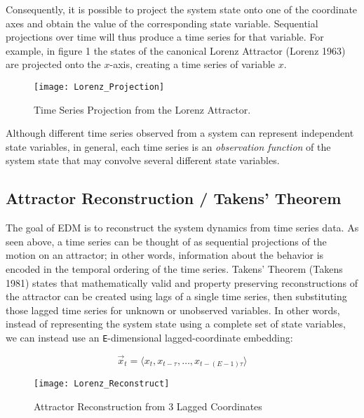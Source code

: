 \documentclass[]{article}
\begin{document}
Consequently, it is possible to project the system state onto one of the
coordinate axes and obtain the value of the corresponding state
variable. Sequential projections over time will thus produce a time
series for that variable. For example, in figure 1 the states of the
canonical Lorenz Attractor (Lorenz 1963) are projected onto the
\(x\)-axis, creating a time series of variable \(x\).

\begin{figure}[h]

{\centering \texttt{[image: Lorenz\_Projection]} 

}

\caption{Time Series Projection from the Lorenz Attractor.}\label{fig:LorenzProjection}
\end{figure}

Although different time series observed from a system can represent
independent state variables, in general, each time series is an
\emph{observation function} of the system state that may convolve
several different state variables.

\hypertarget{attractor-reconstruction-takens-theorem}{%
\subsection{Attractor Reconstruction / Takens'
Theorem}\label{attractor-reconstruction-takens-theorem}}

The goal of EDM is to reconstruct the system dynamics from time series
data. As seen above, a time series can be thought of as sequential
projections of the motion on an attractor; in other words, information
about the behavior is encoded in the temporal ordering of the time
series. Takens' Theorem (Takens 1981) states that mathematically valid
and property preserving reconstructions of the attractor can be created
using lags of a single time series, then substituting those lagged time
series for unknown or unobserved variables. In other words, instead of
representing the system state using a complete set of state variables,
we can instead use an \texttt{E}-dimensional lagged-coordinate
embedding:

\[ \vec{x}_t = \langle x_t, x_{t-\tau}, \dots, x_{t-(E-1)\tau} \rangle \]

\begin{figure}[h]

{\centering \texttt{[image: Lorenz\_Reconstruct]} 

}

\caption{Attractor Reconstruction from 3 Lagged Coordinates}\label{fig:fig_attractor_reconstruction}
\end{figure}
\end{document}
